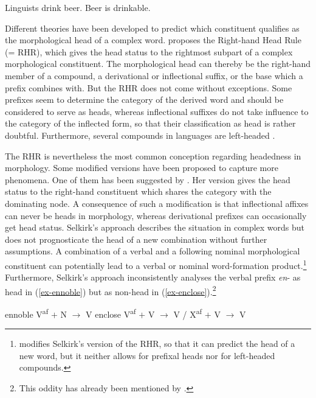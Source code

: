 \documentclass[output=paper
  ,nobabel
  ,draftmode
  ,colorlinks, citecolor=brown
]{langscibook}
\begin{document}
\eal\label{ex-beer}
\ex Linguists drink beer.
\ex Beer is drinkable. 
\zl

\noindent Different theories have been developed to predict which constituent qualifies as the morphological head of a complex word. \citet{Williams1981} proposes the Right-hand Head Rule (= RHR), which gives the head status to the rightmost subpart of a complex morphological constituent. The morphological head can thereby be the right-hand member of a compound, a derivational or inflectional suffix, or the base which a prefix combines with. But the RHR does not come without exceptions. Some  prefixes seem to determine the category of the derived word and should be considered to serve as heads, whereas inflectional suffixes do not take influence to the category of the inflected form, so that their classification as head is rather doubtful. Furthermore, several compounds in  languages are left-headed \citep[cf. e.g.][Section~5]{Scalise1988}.

\largerpage[2]
The RHR is nevertheless the most common conception regarding headedness in morphology. Some modified versions have been proposed to capture more phenomena. One of them has been suggested by \citet{Selkirk1982}. Her version gives the head status to the right-hand constituent which shares the category with the dominating node. A consequence of such a modification is that inflectional affixes can never be heads in morphology, whereas derivational prefixes can occasionally get head status. Selkirk's approach describes the situation in complex words but does not prognosticate the head of a new combination without further assumptions. A combination of a verbal and a following nominal morphological constituent can potentially lead to a verbal or nominal word-formation product.\footnote{\citet{Olsen1990} modifies Selkirk's version of the RHR, so that it can predict the head of a new word, but it neither allows for prefixal heads nor for left-headed compounds.}   Furthermore, Selkirk's approach inconsistently analyses the verbal prefix \emph{en}- as head in (\ref{ex-ennoble}) but as non-head in (\ref{ex-enclose}).\footnote{This oddity has already been mentioned by \citet[167]{TrommelenZonneveld1986}.}

\eal
\ex\label{ex-ennoble}
ennoble \hspace{48pt} V\textsuperscript{af} $+$ N $\rightarrow$ V
\ex\label{ex-enclose} enclose  \hspace{50pt} V\textsuperscript{af} $+$ V $\rightarrow$ V / X\textsuperscript{af} $+$ V $\rightarrow$ V
\zl
\end{document}
